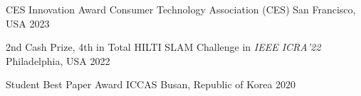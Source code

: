 



\begin{cvhonors}

  \cvhonor
    {CES Innovation Award} %
    {Consumer Technology Association (CES)} %
    {San Francisco, USA} %
    {2023} %

  \cvhonor
    {2nd Cash Prize, 4th in Total} %
    {HILTI SLAM Challenge in \textit{IEEE ICRA'22}} %
    {Philadelphia, USA} %
    {2022} %

  \cvhonor
    {Student Best Paper Award} %
    {ICCAS} %
    {Busan, Republic of Korea} %
    {2020} %

\end{cvhonors}




